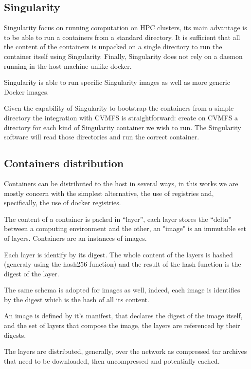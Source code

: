 \subsection{Singularity}

Singularity focus on running computation on HPC clusters, its main advantage is
to be able to run a containers from a standard directory. It is sufficient that
all the content of the containers is unpacked on a single directory to run the
container itself using Singularity. Finally, Singularity does not rely on a
daemon running in the host machine unlike docker.

Singularity is able to run specific Singularity images as well as more generic
Docker images.

Given the capability of Singularity to bootstrap the containers from a simple
directory the integration with CVMFS is straightforward: create on CVMFS a
directory for each kind of Singularity container we wish to run. The
Singularity software will read those directories and run the correct container.

\subsection{Containers distribution}
\label{subsec:singularity-docker-distribution}

Containers can be distributed to the host in several ways, in this works we are
mostly concern with the simplest alternative, the use of registries and,
specifically, the use of docker registries.

The content of a container is packed in “layer”, each layer stores the “delta”
between a computing environment and the other, an "image" is an immutable set
of layers. Containers are an instances of images.

Each layer is identify by its digest. The whole content of the layers is hashed
(generaly using the hash256 function) and the result of the hash function is
the digest of the layer.

The same schema is adopted for images as well, indeed, each image is identifies
by the digest which is the hash of all its content.

An image is defined by it's manifest, that declares the digest of the image
itself, and the set of layers that compose the image, the layers are referenced
by their digests.

The layers are distributed, generally, over the network as compressed tar
archives that need to be downloaded, then uncompressed and potentially cached.

